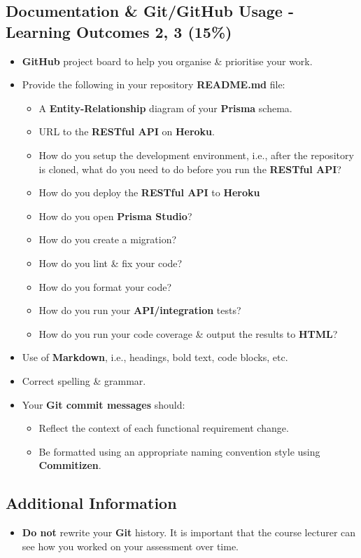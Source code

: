 \documentclass{article}
\begin{document}
\subsection*{Documentation \& Git/GitHub Usage - Learning Outcomes 2, 3 (15\%)}
\begin{itemize}
	\item \textbf{GitHub} project board to help you organise \& prioritise your work. 
	\item Provide the following in your repository \textbf{README.md} file:
	\begin{itemize}
		\item A \textbf{Entity-Relationship} diagram of your \textbf{Prisma} schema.
		\item URL to the \textbf{RESTful API} on \textbf{Heroku}.
		\item How do you setup the development environment, i.e., after the repository is cloned, what do you need to do before you run the \textbf{RESTful API}?
		\item How do you deploy the \textbf{RESTful API} to \textbf{Heroku}
		\item How do you open \textbf{Prisma Studio}?
		\item How do you create a migration?
		\item How do you lint \& fix your code?
		\item How do you format your code?
		\item How do you run your \textbf{API/integration} tests?
		\item How do you run your code coverage \& output the results to \textbf{HTML}?
	\end{itemize}
	\item Use of \textbf{Markdown}, i.e., headings, bold text, code blocks, etc.
	\item Correct spelling \& grammar. 
	\item Your \textbf{Git commit messages} should:
	\begin{itemize}
		\item Reflect the context of each functional requirement change.
		\item Be formatted using an appropriate naming convention style using \textbf{Commitizen}.
	\end{itemize}	
\end{itemize}

\subsection*{Additional Information}
\begin{itemize}
	\item \textbf{Do not} rewrite your \textbf{Git} history. It is important that the course lecturer can see how you worked on your assessment over time.
\end{itemize}
\end{document}
